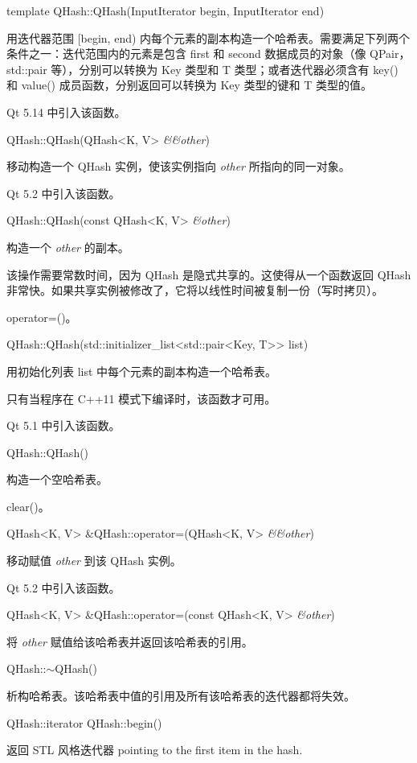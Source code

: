 template QHash::QHash(InputIterator begin, InputIterator end)

用迭代器范围 [begin, end) 内每个元素的副本构造一个哈希表。需要满足下列两个条件之一：迭代范围内的元素是包含 first 和 second 数据成员的对象（像 QPair，std::pair 等），分别可以转换为 Key 类型和 T 类型；或者迭代器必须含有 key() 和 value() 成员函数，分别返回可以转换为 Key 类型的键和 T 类型的值。

Qt 5.14 中引入该函数。

QHash::QHash(QHash<K, V> \emph{\&\&other})

移动构造一个 QHash 实例，使该实例指向 \emph{other} 所指向的同一对象。

Qt 5.2 中引入该函数。

QHash::QHash(const QHash<K, V> \emph{\&other})

构造一个 \emph{other} 的副本。

该操作需要常数时间，因为 QHash 是隐式共享的。这使得从一个函数返回 QHash 非常快。如果共享实例被修改了，它将以线性时间被复制一份（写时拷贝）。

\begin{seeAlso}
operator=()。
\end{seeAlso}


QHash::QHash(std::initializer\_list<std::pair<Key, T>> list)

用初始化列表 list 中每个元素的副本构造一个哈希表。

只有当程序在 C++11 模式下编译时，该函数才可用。

Qt 5.1 中引入该函数。

QHash::QHash()

构造一个空哈希表。

\begin{seeAlso}
clear()。
\end{seeAlso}


QHash<K, V> \&QHash::operator=(QHash<K, V> \emph{\&\&other})

移动赋值 \emph{other} 到该 QHash 实例。

Qt 5.2 中引入该函数。

QHash<K, V> \&QHash::operator=(const QHash<K, V> \emph{\&other})

将 \emph{other} 赋值给该哈希表并返回该哈希表的引用。

QHash::$\sim$QHash()

析构哈希表。该哈希表中值的引用及所有该哈希表的迭代器都将失效。

QHash::iterator QHash::begin()

返回 STL 风格迭代器 pointing to the first item in the hash.


